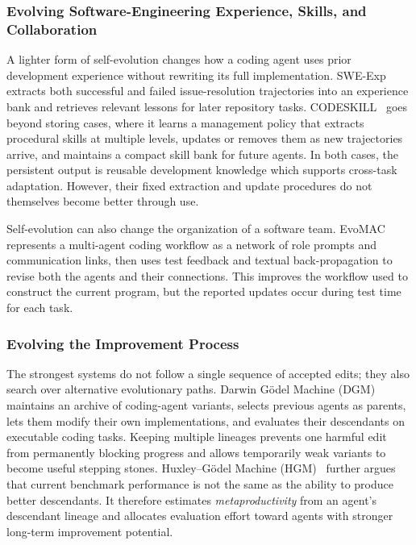 \subsubsection{Evolving Software-Engineering Experience, Skills, and Collaboration}

A lighter form of self-evolution changes how a coding agent uses prior development experience without rewriting its full implementation. SWE-Exp~\cite{chen2026sweexp} extracts both successful and failed issue-resolution trajectories into an experience bank and retrieves relevant lessons for later repository tasks. CODESKILL~\cite{li2026codeskill} goes beyond storing cases, where it learns a management policy that extracts procedural skills at multiple levels, updates or removes them as new trajectories arrive, and maintains a compact skill bank for future agents. 
In both cases, the persistent output is reusable development knowledge which supports cross-task adaptation. However, their fixed extraction and update procedures do not themselves become better through use.

Self-evolution can also change the organization of a software team. EvoMAC~\cite{hu2025evomac} represents a multi-agent coding workflow as a network of role prompts and communication links, then uses test feedback and textual back-propagation to revise both the agents and their connections. 
This improves the workflow used to construct the current program, but the reported updates occur during test time for each task.

\subsubsection{Evolving the Improvement Process}

The strongest systems do not follow a single sequence of accepted edits; they also search over alternative evolutionary paths. Darwin G\"odel Machine (DGM)~\cite{zhang2026dgm} maintains an archive of coding-agent variants, selects previous agents as parents, lets them modify their own implementations, and evaluates their descendants on executable coding tasks. Keeping multiple lineages prevents one harmful edit from permanently blocking progress and allows temporarily weak variants to become useful stepping stones. Huxley--G\"odel Machine (HGM)~\cite{wang2026hgm} further argues that current benchmark performance is not the same as the ability to produce better descendants. It therefore estimates \emph{metaproductivity} from an agent's descendant lineage and allocates evaluation effort toward agents with stronger long-term improvement potential.

